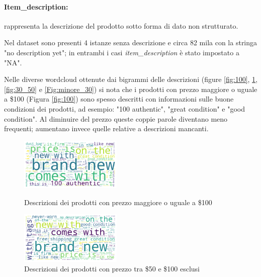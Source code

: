 \paragraph{Item\_description:} rappresenta la descrizione del prodotto sotto forma
di dato non strutturato.

Nel dataset sono presenti 4 istanze senza descrizione e
circa 82 mila con la stringa "no description yet"; in entrambi i casi
\textit{item\_description} è stato impostato a "NA".

Nelle diverse wordcloud ottenute dai bigrammi delle descrizioni (figure
\ref{fig:100}, \ref{Fig:50_100}, \ref{fig:30_50} e \ref{Fig:minore_30}) si nota
che i prodotti con prezzo maggiore o uguale a \$100 (Figura \ref{fig:100}) sono
spesso descritti con informazioni sulle buone condizioni dei prodotti, ad
esempio: "100 authentic", "great condition" e "good condition". Al diminuire del
prezzo queste coppie parole diventano meno frequenti; aumentano invece quelle
relative a descrizioni mancanti.

\begin{figure}[H]
   \begin{minipage}{0.48\textwidth}
     \centering
     \includegraphics[height=2.5cm, keepaspectratio]{maggiore_100}
	\caption{Descrizioni dei prodotti con prezzo maggiore o uguale a \$100}
	\label{fig:100}   
	\end{minipage}\hfill
   \begin{minipage}{0.48\textwidth}
     \centering
     \includegraphics[height=2.5cm, keepaspectratio]{50_100}
     \caption{Descrizioni dei prodotti con prezzo tra \$50 e \$100 esclusi}
     \label{Fig:50_100}
   \end{minipage}
\end{figure}

